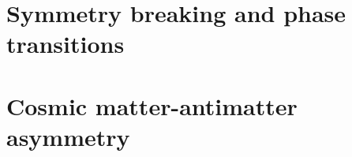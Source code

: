 \documentclass[main.tex]{subfiles}
\begin{document}
\section{Symmetry breaking and phase transitions}


\section{Cosmic matter-antimatter asymmetry}
\end{document}

